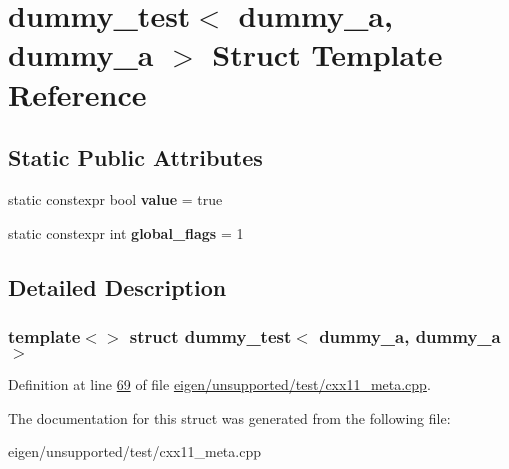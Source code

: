 \hypertarget{structdummy__test_3_01dummy__a_00_01dummy__a_01_4}{}\section{dummy\+\_\+test$<$ dummy\+\_\+a, dummy\+\_\+a $>$ Struct Template Reference}
\label{structdummy__test_3_01dummy__a_00_01dummy__a_01_4}
\subsection*{Static Public Attributes}
\begin{DoxyCompactItemize}
\item 
\mbox{\label{structdummy__test_3_01dummy__a_00_01dummy__a_01_4_acb2159524efd814c807927523b962d2e}} 
static constexpr bool {\bfseries value} = true
\item 
\mbox{\label{structdummy__test_3_01dummy__a_00_01dummy__a_01_4_acef373a75a8b5ca54e431d435bac9f6a}} 
static constexpr int {\bfseries global\+\_\+flags} = 1
\end{DoxyCompactItemize}


\subsection{Detailed Description}
\subsubsection*{template$<$$>$\newline
struct dummy\+\_\+test$<$ dummy\+\_\+a, dummy\+\_\+a $>$}



Definition at line \hyperlink{eigen_2unsupported_2test_2cxx11__meta_8cpp_source_l00069}{69} of file \hyperlink{eigen_2unsupported_2test_2cxx11__meta_8cpp_source}{eigen/unsupported/test/cxx11\+\_\+meta.\+cpp}.



The documentation for this struct was generated from the following file\+:\begin{DoxyCompactItemize}
\item 
eigen/unsupported/test/cxx11\+\_\+meta.\+cpp\end{DoxyCompactItemize}
